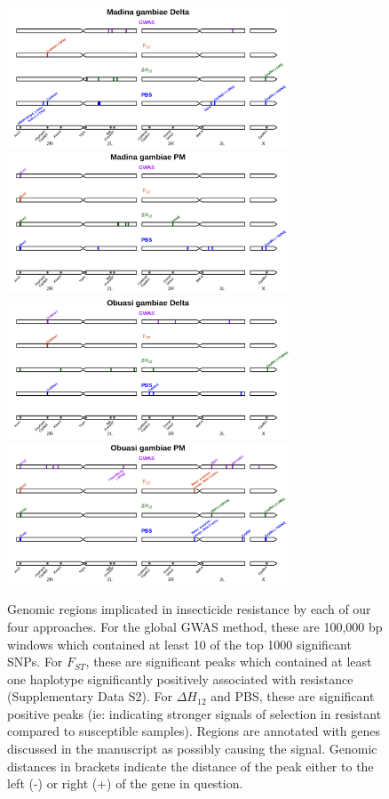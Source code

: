 \documentclass[a4paper,12pt]{article}
\begin{document}
\begin{figure}[h]
	\vskip 0.4cm
	\hspace{-0.3cm}\includegraphics*[width = 8.4cm]{../supplementary_implicated_regions/Madina_gambiae_Delta_implicated_regions.png}
	\hspace{-0.3cm}\includegraphics*[width = 8.4cm]{../supplementary_implicated_regions/Madina_gambiae_PM_implicated_regions.png}
	\vskip 0.4cm
	\hspace{-0.3cm}\includegraphics*[width = 8.4cm]{../supplementary_implicated_regions/Obuasi_gambiae_Delta_implicated_regions.png}
	\hspace{-0.3cm}\includegraphics*[width = 8.4cm]{../supplementary_implicated_regions/Obuasi_gambiae_PM_implicated_regions.png}
	\caption{\footnotesize Genomic regions implicated in insecticide resistance by each of our four approaches. For the global GWAS method, these are 100,000 bp windows which contained at least 10 of the top 1000 significant SNPs. For $F_{ST}$, these are significant peaks which contained at least one haplotype significantly positively associated with resistance (Supplementary Data S2). For $\Delta H_{12}$ and PBS, these are significant positive peaks (ie: indicating stronger signals of selection in resistant compared to susceptible samples). Regions are annotated with genes discussed in the manuscript as possibly causing the signal. Genomic distances in brackets indicate the distance of the peak either to the left (-) or right (+) of the gene in question.}
	\label{FigS4}
\end{figure}
\end{document}
